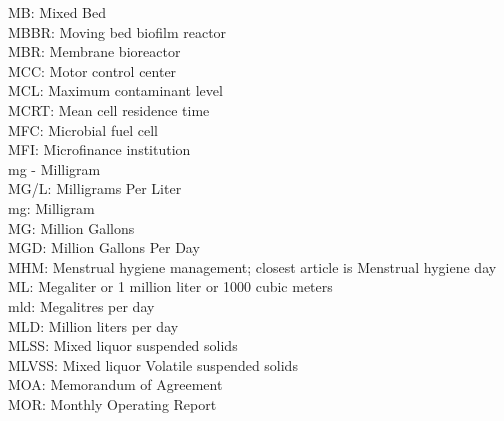 \documentclass{article}
\begin{document}
MB:  Mixed Bed
\vspace{0.3cm}\\
MBBR:  Moving bed biofilm reactor
\vspace{0.3cm}\\
MBR:  Membrane bioreactor
\vspace{0.3cm}\\
MCC:  Motor control center
\vspace{0.3cm}\\
MCL:  Maximum contaminant level
\vspace{0.3cm}\\
MCRT:  Mean cell residence time
\vspace{0.3cm}\\
MFC:  Microbial fuel cell
\vspace{0.3cm}\\
MFI:  Microfinance institution
\vspace{0.3cm}\\
mg - Milligram
\vspace{0.3cm}\\
MG/L:  Milligrams Per Liter
\vspace{0.3cm}\\
mg:  Milligram
\vspace{0.3cm}\\
MG:  Million Gallons
\vspace{0.3cm}\\
MGD:  Million Gallons Per Day
\vspace{0.3cm}\\
MHM:  Menstrual hygiene management; closest article is Menstrual hygiene day
\vspace{0.3cm}\\
ML:  Megaliter or 1 million liter or 1000 cubic meters
\vspace{0.3cm}\\
mld:  Megalitres per day
\vspace{0.3cm}\\
MLD:  Million liters per day
\vspace{0.3cm}\\
MLSS:  Mixed liquor suspended solids
\vspace{0.3cm}\\
MLVSS:  Mixed liquor Volatile suspended solids
\vspace{0.3cm}\\
MOA:  Memorandum of Agreement
\vspace{0.3cm}\\
MOR:  Monthly Operating Report
\end{document}
